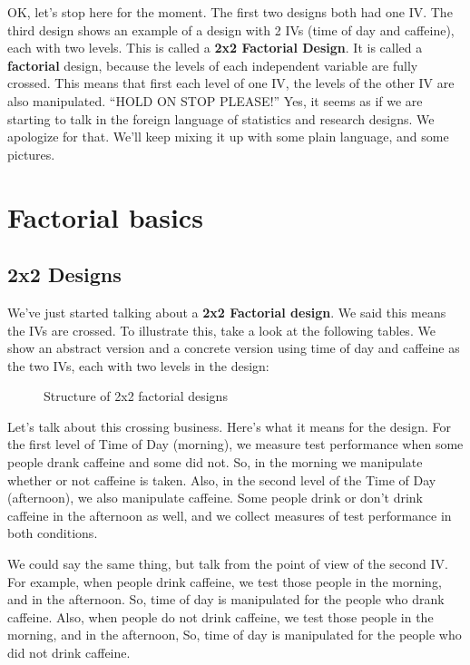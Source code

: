 \documentclass[
]{book}
\makeatletter
\newcommand*\pandocbounded[1]{%
  \sbox\pandoc@box{#1}%
  \Gscale@div\@tempa{\textheight}{\dimexpr\ht\pandoc@box+\dp\pandoc@box\relax}%
  \Gscale@div\@tempb{\linewidth}{\wd\pandoc@box}%
  \ifdim\@tempb\p@<\@tempa\p@\let\@tempa\@tempb\fi%
  \ifdim\@tempa\p@<\p@\scalebox{\@tempa}{\usebox\pandoc@box}%
  \else\usebox{\pandoc@box}%
  \fi%
}
\makeatother
\begin{document}
OK, let's stop here for the moment. The first two designs both had one IV. The third design shows an example of a design with 2 IVs (time of day and caffeine), each with two levels. This is called a \textbf{2x2 Factorial Design}. It is called a \textbf{factorial} design, because the levels of each independent variable are fully crossed. This means that first each level of one IV, the levels of the other IV are also manipulated. ``HOLD ON STOP PLEASE!'' Yes, it seems as if we are starting to talk in the foreign language of statistics and research designs. We apologize for that. We'll keep mixing it up with some plain language, and some pictures.

\section{Factorial basics}\label{factorial-basics}

\subsection{2x2 Designs}\label{x2-designs}

We've just started talking about a \textbf{2x2 Factorial design}. We said this means the IVs are crossed. To illustrate this, take a look at the following tables. We show an abstract version and a concrete version using time of day and caffeine as the two IVs, each with two levels in the design:

\begin{figure}
\centering
\pandocbounded{\texttt{[image: figures/2x2Design.png]}}
\caption{\label{fig:9designs}Structure of 2x2 factorial designs}
\end{figure}

Let's talk about this crossing business. Here's what it means for the design. For the first level of Time of Day (morning), we measure test performance when some people drank caffeine and some did not. So, in the morning we manipulate whether or not caffeine is taken. Also, in the second level of the Time of Day (afternoon), we also manipulate caffeine. Some people drink or don't drink caffeine in the afternoon as well, and we collect measures of test performance in both conditions.

We could say the same thing, but talk from the point of view of the second IV. For example, when people drink caffeine, we test those people in the morning, and in the afternoon. So, time of day is manipulated for the people who drank caffeine. Also, when people do not drink caffeine, we test those people in the morning, and in the afternoon, So, time of day is manipulated for the people who did not drink caffeine.
\end{document}
